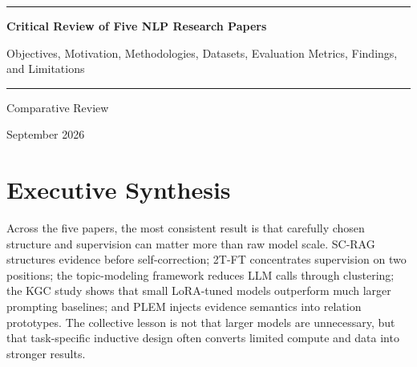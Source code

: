 \documentclass[11pt]{article}
\begin{document}
\hypersetup{pageanchor=false}
\begin{titlepage}
\thispagestyle{empty}
\centering
\vspace*{2.2cm}
{\color{reportblue}\rule{\textwidth}{1.2pt}\par}
\vspace{1.2cm}
{\Huge\bfseries Critical Review of Five NLP Research Papers\par}
\vspace{0.8cm}
{\Large Objectives, Motivation, Methodologies, Datasets, Evaluation
Metrics, Findings, and Limitations\par}
\vspace{1.2cm}
{\color{reportblue}\rule{0.72\textwidth}{0.6pt}\par}
\vfill
{\large Comparative Review\par}
\vspace{0.35cm}
{\large September 2026\par}
\vspace*{1.8cm}
\end{titlepage}

\hypersetup{pageanchor=true}
\tableofcontents
\clearpage
{}

\section{Executive Synthesis}\label{executive-synthesis}

Across the five papers, the most consistent result is that carefully
chosen structure and supervision can matter more than raw model scale.
SC-RAG structures evidence before self-correction; 2T-FT concentrates
supervision on two positions; the topic-modeling framework reduces LLM
calls through clustering; the KGC study shows that small LoRA-tuned
models outperform much larger prompting baselines; and PLEM injects
evidence semantics into relation prototypes. The collective lesson is
not that larger models are unnecessary, but that task-specific inductive
design often converts limited compute and data into stronger results.
\end{document}
